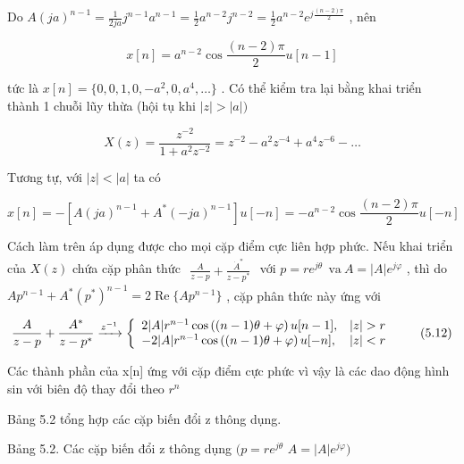 \documentclass[
  10
]{article}
\begin{document}
Do
\(A ( j a ) ^ { n - 1 } = { \textstyle { \frac { 1 } { 2 j a } } } j ^ { n - 1 } a ^ { n - 1 } = { \textstyle { \frac { 1 } { 2 } } } a ^ { n - 2 } j ^ { n - 2 } = { \textstyle { \frac { 1 } { 2 } } } a ^ { n - 2 } e ^ { j { \textstyle { \frac { ( n - 2 ) \pi } { 2 } } } }\)
, nên

\[
x [ n ] = a ^ {n - 2} \cos {\frac {(n - 2) \pi}{2}} u [ n - 1 ]
\]

tức là
\(x [ n ] = \{ 0 , 0 , 1 , 0 , - a ^ { 2 } , 0 , a ^ { 4 } , \ldots \}\)
. Có thể kiểm tra lại bằng khai triển thành 1 chuỗi lũy thừa (hội tụ khi
\(| z | > | a | )\)

\[
X (z) = \frac {z ^ {- 2}}{1 + a ^ {2} z ^ {- 2}} = z ^ {- 2} - a ^ {2} z ^ {- 4} + a ^ {4} z ^ {- 6} - \dots
\]

Tương tự, với \(| z | < | a |\) ta có

\[
x [ n ] = - \left[ A (j a) ^ {n - 1} + A ^ {*} (- j a) ^ {n - 1} \right] u [ - n ] = - a ^ {n - 2} \cos {\frac {(n - 2) \pi}{2}} u [ - n ]
\]

Cách làm trên áp dụng được cho mọi cặp điểm cực liên hợp phức. Nếu khai
triển của \(X ( z )\) chứa cặp phân thức
\(\begin{array} { r } { \frac { A } { z - p } + \frac { \dot { A } ^ { * } } { z - p ^ { * } } } \end{array}\)
với
\(p = r e ^ { j \theta } { \mathrm {  ~ \ v a ~ } } A = | A | e ^ { j \varphi }\)
, thì do
\(A p ^ { n - 1 } + A ^ { * } ( p ^ { * } ) ^ { n - 1 } = 2 \operatorname { R e } \{ A p ^ { n - 1 } \}\)
, cặp phân thức này ứng với

\[
\frac {A}{z - p} + \frac {A ^ {*}}{z - p ^ {*}} \xrightarrow {z ^ {- 1}} \left\{ \begin{array}{l l} 2 | A |   r ^ {n - 1} \cos \left((n - 1) \theta + \varphi\right) u [ n - 1 ], & | z | > r \\ - 2 | A |   r ^ {n - 1} \cos \left((n - 1) \theta + \varphi\right) u [ - n ], & | z | <   r \end{array} \right.\tag{5.12}
\]

Các thành phần của x{[}n{]} ứng với cặp điểm cực phức vì vậy là các dao
động hình sin với biên độ thay đổi theo \(r ^ { n }\) 

Bảng 5.2 tổng hợp các cặp biến đổi z thông dụng.

Bảng 5.2. Các cặp biến đổi z thông dụng \(( p = r e ^ { j \theta }\)
\(A = | A | e ^ { j \varphi } )\)
\end{document}
